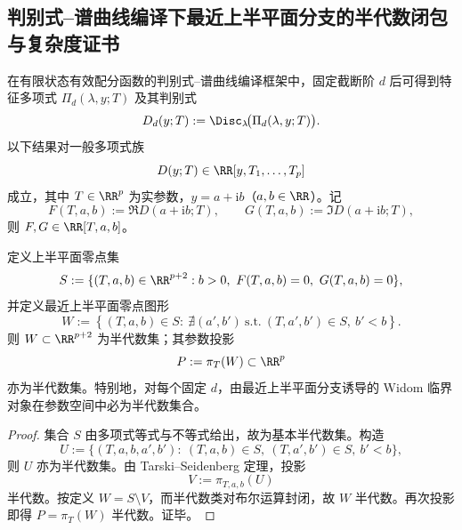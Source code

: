 \subsection{判别式--谱曲线编译下最近上半平面分支的半代数闭包与复杂度证书}\label{subsec:conclusion-discriminant-widom-semi-algebraic-nash-complexity}
在有限状态有效配分函数的判别式--谱曲线编译框架中，固定截断阶 \(d\) 后可得到特征多项式 \(\Pi_d(\lambda,y;T)\) 及其判别式
\[
D_d(y;T):=\Disc_{\lambda}\!\bigl(\Pi_d(\lambda,y;T)\bigr).
\]
以下结果对一般多项式族
\[
D(y;T)\in\RR[y,T_1,\dots,T_p]
\]
成立，其中 \(T\in\RR^p\) 为实参数，\(y=a+\mathrm{i}b\)（\(a,b\in\RR\)）。记
\[
F(T,a,b):=\Re D(a+\mathrm{i}b;T),\qquad
G(T,a,b):=\Im D(a+\mathrm{i}b;T),
\]
则 \(F,G\in\RR[T,a,b]\)。

\begin{theorem}[最近上半平面分支图形的半代数性闭包]\label{thm:conclusion-widom-nearest-branch-semi-algebraic-closure}
定义上半平面零点集
\[
S:=\{(T,a,b)\in\RR^{p+2}: b>0,\ F(T,a,b)=0,\ G(T,a,b)=0\},
\]
并定义最近上半平面零点图形
\[
W:=\left\{
(T,a,b)\in S:\ \nexists(a',b')\ \text{s.t.}\ (T,a',b')\in S,\ b'<b
\right\}.
\]
则 \(W\subset\RR^{p+2}\) 为半代数集；其参数投影
\[
P:=\pi_T(W)\subset\RR^p
\]
亦为半代数集。特别地，对每个固定 \(d\)，由最近上半平面分支诱导的 Widom 临界对象在参数空间中必为半代数集合。
\end{theorem}
\begin{proof}
集合 \(S\) 由多项式等式与不等式给出，故为基本半代数集。构造
\[
U:=\{(T,a,b,a',b'):\ (T,a,b)\in S,\ (T,a',b')\in S,\ b'<b\},
\]
则 \(U\) 亦为半代数集。由 Tarski--Seidenberg 定理，投影
\[
V:=\pi_{T,a,b}(U)
\]
半代数。按定义 \(W=S\setminus V\)，而半代数类对布尔运算封闭，故 \(W\) 半代数。再次投影即得 \(P=\pi_T(W)\) 半代数。证毕。
\end{proof}


